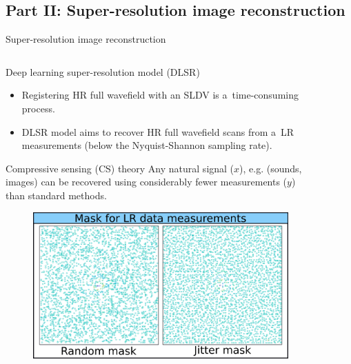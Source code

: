 \documentclass[10pt,aspectratio=169,dvipsnames]{beamer} %
\begin{document}
\subsection{Part II: Super-resolution image reconstruction}
\begin{frame}{Super-resolution image reconstruction}
	\begin{columns}[T]
		\begin{column}[t]{0.6\textwidth}
			\begin{alertblock}{Deep learning super-resolution model (DLSR)}					
				\begin{footnotesize}
					\justifying
					\addtolength{\leftmargini}{\labelsep}
					\begin{itemize}
						\item Registering HR full wavefield with an SLDV is a~time-consuming process.
						\item DLSR model aims to recover HR full wavefield scans from a~LR measurements (below the Nyquist-Shannon sampling rate).
					\end{itemize} 
				\end{footnotesize}					
			\end{alertblock}						
			\begin{exampleblock}{Compressive sensing (CS) theory}
				\footnotesize
				\justifying
				Any natural signal (\(x\)), e.g. (sounds, images) can be recovered using considerably fewer measurements (\(y\)) than standard methods.
				\vfill
				\begin{figure}[ht!]
					\centering
					\includegraphics[width=.45\textwidth]{matrix_mask.png}
				\end{figure}
			\end{exampleblock}							
		\end{column}
		\begin{column}[t]{0.4\textwidth}
			\begin{figure}[ht!]
				\centering

\end{figure}
\end{column}
\end{columns}
\end{frame}
\end{document}
